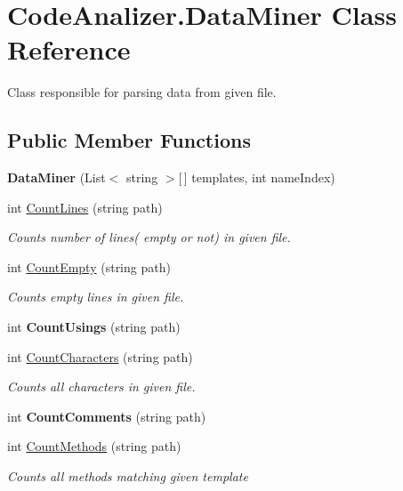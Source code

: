 \hypertarget{class_code_analizer_1_1_data_miner}{}\section{Code\+Analizer.\+Data\+Miner Class Reference}
\label{class_code_analizer_1_1_data_miner}


Class responsible for parsing data from given file.  


\subsection*{Public Member Functions}
\begin{DoxyCompactItemize}
\item 
\mbox{\label{class_code_analizer_1_1_data_miner_a01f2354a892dc3a4f387c48d32a0460d}} 
{\bfseries Data\+Miner} (List$<$ string $>$\mbox{[}$\,$\mbox{]} templates, int name\+Index)
\item 
int \mbox{\hyperlink{class_code_analizer_1_1_data_miner_a706750ce1506885051c9879b88615bc5}{Count\+Lines}} (string path)
\begin{DoxyCompactList}\small\item\em Counts number of lines( empty or not) in given file. \end{DoxyCompactList}\item 
int \mbox{\hyperlink{class_code_analizer_1_1_data_miner_a5071efa31874229befaefa1ec5f4dfcb}{Count\+Empty}} (string path)
\begin{DoxyCompactList}\small\item\em Counts empty lines in given file. \end{DoxyCompactList}\item 
\mbox{\label{class_code_analizer_1_1_data_miner_a38c01e451d8869d669077504c2103be9}} 
int {\bfseries Count\+Usings} (string path)
\item 
int \mbox{\hyperlink{class_code_analizer_1_1_data_miner_afdd5aa746928000245a570ee2af8ee52}{Count\+Characters}} (string path)
\begin{DoxyCompactList}\small\item\em Counts all characters in given file. \end{DoxyCompactList}\item 
\mbox{\label{class_code_analizer_1_1_data_miner_a3b6e5a7cfe4426b1dd8e52f1024fcd2f}} 
int {\bfseries Count\+Comments} (string path)
\item 
int \mbox{\hyperlink{class_code_analizer_1_1_data_miner_aa125dd16b9cd80855b93a00f3b0bae13}{Count\+Methods}} (string path)
\begin{DoxyCompactList}\small\item\em Counts all methods matching given template \end{DoxyCompactList}\end{DoxyCompactItemize}


